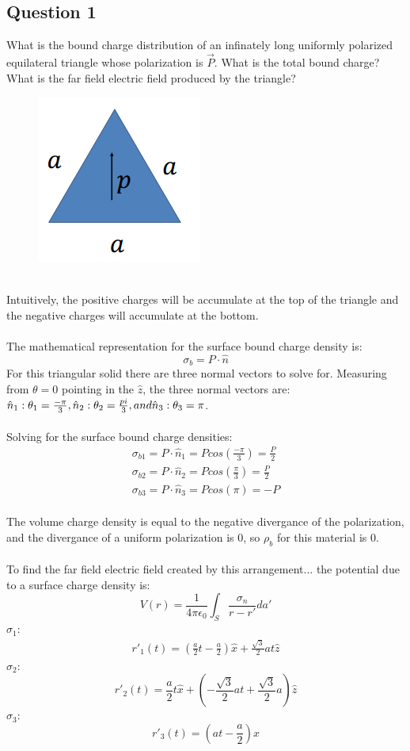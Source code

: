 \documentclass[a4paper,12pt]{article}
\newcommand{\V}[1]{\ensuremath{\vec{#1}}}
\newcommand{\F}[2]{\ensuremath{\frac{#1}{#2}}}
\newcommand{\LP}{\left(}
\newcommand{\RP}{\right)}
\begin{document}
\subsection*{Question 1}
What is the bound charge distribution of an infinately long uniformly polarized equilateral triangle whose polarization is $\V{P}$. What is the total bound charge? What is the far field electric field produced by the triangle?
\begin{figure}[h]
\centering
\includegraphics{Triangle-Dielectric.png}
\end{figure}\\
Intuitively, the positive charges will be accumulate at the top of the triangle and the negative charges will accumulate at the bottom. \\
\\
The mathematical representation for the surface bound charge density is:
\[\sigma_b=P\cdot\hat{n}\]
For this triangular solid there are three normal vectors to solve for.  Measuring from $\theta=0$ pointing in the $\hat{z}$, the three normal vectors are: $\hat{n}_1: \theta_1=\F{-\pi}{3}, \hat{n}_2:\theta_2=\F{\\pi}{3}, and \hat{n}_3:\theta_3=\pi$.\\
\\
Solving for the surface bound charge densities:
\begin{align*}
\sigma_{b1}=P\cdot\hat{n}_1=Pcos\LP\F{-\pi}{3}\RP=\F{P}{2}\\
\sigma_{b2}=P\cdot\hat{n}_2=Pcos\LP\F{\pi}{3}\RP=\F{P}{2}\\
\sigma_{b3}=P\cdot\hat{n}_3=Pcos(\pi)=-P
\end{align*}\\
The volume charge density is equal to the negative divergance of the polarization, and the divergance of a uniform polarization is 0, so $\rho_b$ for this material is 0.\\
\\
To find the far field electric field created by this arrangement...  the potential due to a surface charge density is:
\[V(r)=\F{1}{4\pi\epsilon_0}\int_S\F{\sigma_n}{r-r'}da'\]
$\sigma_1$:
\begin{align*}
r'_1(t)=\LP\F{a}{2}t-\F{a}{2}\RP\hat{x}+\F{\sqrt{3}}{2}at\hat{z}
\end{align*}
$\sigma_2$:
\[r'_2(t)=\F{a}{2}t\hat{x}+\LP-\F{\sqrt{3}}{2}at+\F{\sqrt{3}}{2}a\RP\hat{z}\]
$\sigma_3$:
\[r'_3(t)=\LP at-\F{a}{2}\RP\hat{x}\]
\end{document}
